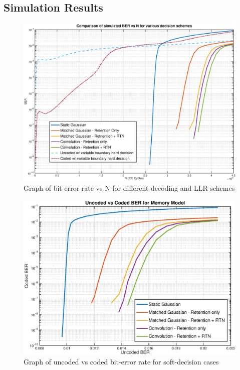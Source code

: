 \documentclass[11pt]{article}
\numberwithin{equation}{subsection}
\begin{document}
\subsection{Simulation Results}
\begin{figure}[ht]
\centering
\includegraphics[scale=0.52]{codedBER_NCycles}
\caption{Graph of bit-error rate vs N for different decoding and LLR schemes}
\label{fig:memory_results_graph}
\end{figure}
\begin{figure}[ht]
\centering
\includegraphics[scale=0.66]{cber_uber_memory}
\caption{Graph of uncoded vs coded bit-error rate for soft-decision cases}
\label{fig:memory_results_graph2}
\end{figure}
\end{document}
